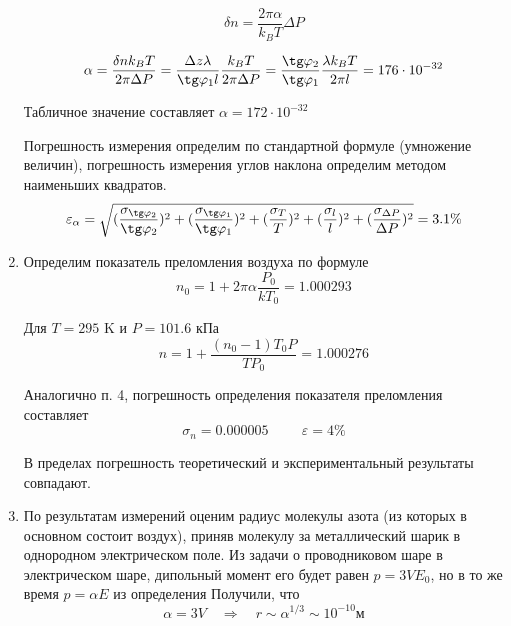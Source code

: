 \documentclass[a4paper,12pt]{article}
\theoremstyle{definition}
\begin{document}
\begin{enumerate}
\begin{equation}
\delta n = \frac{2 \pi \alpha}{k_B T} \Delta P
\end{equation}

\begin{equation}
\alpha = \frac{\delta n k_B T}{2 \pi \Delta P} = \frac{\Delta z \lambda}{\tg \varphi_1 l} \frac{k_B T}{2 \pi \Delta P} =\frac{\tg \varphi_2}{\tg \varphi_1} \frac{\lambda k_B T}{2 \pi l} = 176 \cdot 10^{-32}
\end{equation}

Табличное значение составляет $\alpha = 172 \cdot 10^{-32}$

Погрешность измерения определим по стандартной формуле (умножение величин), погрешность измерения углов наклона определим методом наименьших квадратов.
\begin{equation}
\varepsilon_{\alpha} = \sqrt{(\frac{\sigma_{\tg \varphi_2}}{\tg \varphi_2})^2 + (\frac{\sigma_{\tg \varphi_1}}{\tg \varphi_1})^2 + (\frac{\sigma_{T}}{T})^2 + (\frac{\sigma_{l}}{l})^2 + (\frac{\sigma_{\Delta P}}{\Delta P})^2} = 3.1\%
\end{equation}

\item Определим показатель преломления воздуха по формуле
\begin{equation}
    n_0 = 1 + 2\pi\alpha \frac{P_0}{kT_0} = 1.000293
\end{equation}

Для $T = 295$ K и $P = 101.6$ кПа
\begin{equation}
    n = 1 + \frac{(n_0 - 1)T_0 P}{T P_0} = 1.000276
\end{equation}

Аналогично п. 4, погрешность определения показателя преломления составляет 
\begin{equation}
    \sigma_n = 0.000005 \hspace{1cm} \varepsilon = 4 \%
\end{equation}

В пределах погрешность теоретический и экспериментальный результаты совпадают.

\item По результатам измерений оценим радиус молекулы азота (из которых в основном состоит воздух), приняв молекулу за металлический шарик в однородном электрическом поле. Из задачи о проводниковом шаре в электрическом шаре, дипольный момент его будет равен $p = 3V E_0$, но в то же время $p = \alpha E$ из определения
Получили, что 
\begin{equation}
    \alpha = 3 V \quad \Rightarrow \quad r \sim \alpha^{1/3} \sim 10^{-10} \text{м}
\end{equation}


\end{enumerate}
\end{document}
